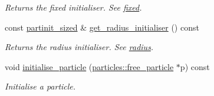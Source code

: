 \begin{DoxyCompactItemize}
\begin{DoxyCompactList}\small\item\em Returns the fixed initialiser. See \hyperlink{classphysim_1_1init_1_1initialiser_a0deb0d7e29b824274c4cd81306b42465}{fixed}. \end{DoxyCompactList}\item 
\mbox{\label{classphysim_1_1init_1_1initialiser_aa2468ca673715dfa220e02fa102daf9f}} 
const \hyperlink{namespacephysim_1_1init_a366bf3e2a64457ad4e3b16c6d671bf7c}{partinit\+\_\+sized} \& \hyperlink{classphysim_1_1init_1_1initialiser_aa2468ca673715dfa220e02fa102daf9f}{get\+\_\+radius\+\_\+initialiser} () const
\begin{DoxyCompactList}\small\item\em Returns the radius initialiser. See \hyperlink{classphysim_1_1init_1_1initialiser_a883682307e10c2204e0ea5ec5b217e81}{radius}. \end{DoxyCompactList}\item 
void \hyperlink{classphysim_1_1init_1_1initialiser_a38515a798b81f40db3ca05812c752093}{initialise\+\_\+particle} (\hyperlink{classphysim_1_1particles_1_1free__particle}{particles\+::free\+\_\+particle} $\ast$p) const
\begin{DoxyCompactList}\small\item\em Initialise a particle. \end{DoxyCompactList}\end{DoxyCompactItemize}
